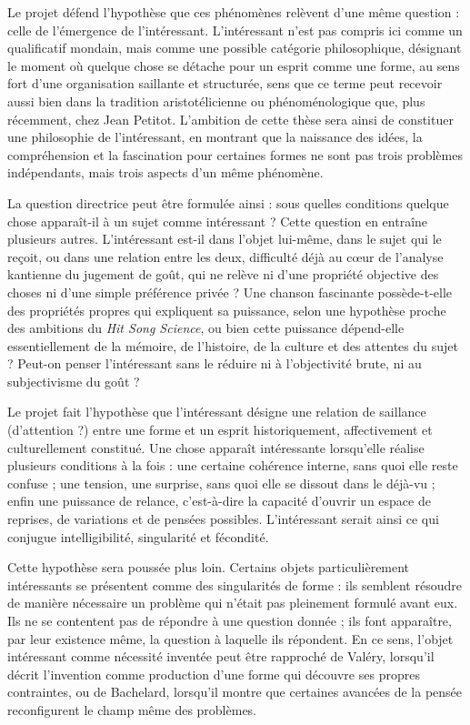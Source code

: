 \documentclass[10pt,a4paper]{article}
\begin{document}
Le projet défend l'hypothèse que ces phénomènes relèvent d'une même question :
celle de l'émergence de l'intéressant. L'intéressant n'est pas compris ici comme
un qualificatif mondain, mais comme une possible catégorie philosophique,
désignant le moment où quelque chose se détache pour un esprit comme une forme,
au sens fort d'une organisation saillante et structurée, sens que ce terme peut
recevoir aussi bien dans la tradition aristotélicienne ou phénoménologique que,
plus récemment, chez Jean Petitot. L'ambition de cette thèse sera ainsi de
constituer une philosophie de l'intéressant, en montrant que la naissance des
idées, la compréhension et la fascination pour certaines formes ne sont pas trois
problèmes indépendants, mais trois aspects d'un même phénomène.

La question directrice peut être formulée ainsi : sous quelles conditions quelque
chose apparaît-il à un sujet comme intéressant ? Cette question en entraîne
plusieurs autres. L'intéressant est-il dans l'objet lui-même, dans le sujet qui le
reçoit, ou dans une relation entre les deux, difficulté déjà au cœur de l'analyse
kantienne du jugement de goût, qui ne relève ni d'une propriété objective des
choses ni d'une simple préférence privée ? Une chanson fascinante possède-t-elle
des propriétés propres qui expliquent sa puissance, selon une hypothèse proche
des ambitions du \emph{Hit Song Science}, ou bien cette puissance dépend-elle
essentiellement de la mémoire, de l'histoire, de la culture et des attentes du
sujet ? Peut-on penser l'intéressant sans le réduire ni à l'objectivité brute, ni
au subjectivisme du goût ?

Le projet fait l'hypothèse que l'intéressant désigne une relation de saillance
(d'attention ?) entre une forme et un esprit historiquement, affectivement et
culturellement constitué. Une chose apparaît intéressante lorsqu'elle réalise
plusieurs conditions à la fois : une certaine cohérence interne, sans quoi elle
reste confuse ; une tension, une surprise, sans quoi elle se dissout dans le
déjà-vu ; enfin une puissance de relance, c'est-à-dire la capacité d'ouvrir un
espace de reprises, de variations et de pensées possibles. L'intéressant serait
ainsi ce qui conjugue intelligibilité, singularité et fécondité.

Cette hypothèse sera poussée plus loin. Certains objets particulièrement
intéressants se présentent comme des singularités de forme : ils semblent
résoudre de manière nécessaire un problème qui n'était pas pleinement formulé
avant eux. Ils ne se contentent pas de répondre à une question donnée ; ils font
apparaître, par leur existence même, la question à laquelle ils répondent. En ce
sens, l'objet intéressant comme nécessité inventée peut être rapproché de Valéry,
lorsqu'il décrit l'invention comme production d'une forme qui découvre ses
propres contraintes, ou de Bachelard, lorsqu'il montre que certaines avancées de
la pensée reconfigurent le champ même des problèmes.
\end{document}
